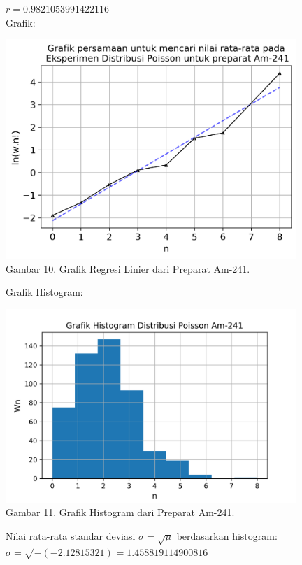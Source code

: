 \documentclass{article}
\begin{document}
			$r = 0.9821053991422116$ \\			
			Grafik: 
			\begin{center}
				\includegraphics[width=110mm]{Data/Am-241-Graph.png}\\
				Gambar 10. Grafik Regresi Linier dari Preparat Am-241.
			\end{center} \newpage
			Grafik Histogram:
			\begin{center}
				\includegraphics[width=110mm]{Data/Am-241.png}\\
				Gambar 11. Grafik Histogram dari Preparat Am-241.
			\end{center}
			Nilai rata-rata standar deviasi $\sigma = \sqrt{\mu}$ berdasarkan histogram:\\			
			$\sigma = \sqrt{-(-2.12815321)} = 1.458819114900816$
			
\end{document}
